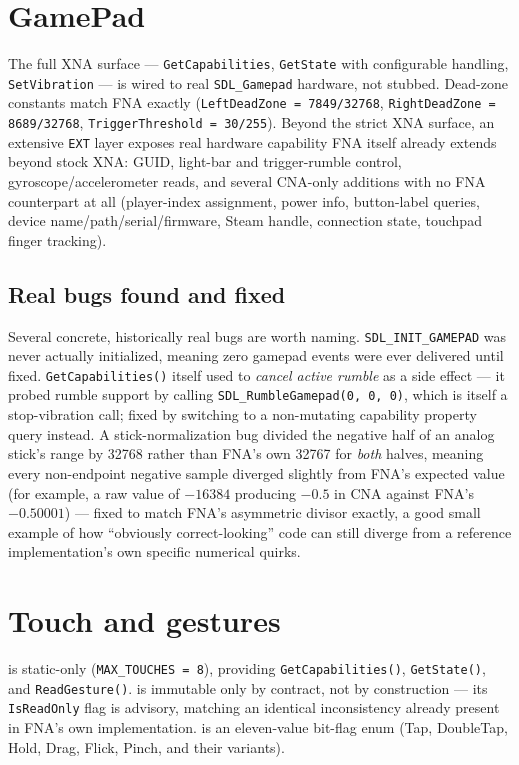\section{GamePad}

The full XNA surface --- \texttt{GetCapabilities}, \texttt{GetState} with configurable
 handling, \texttt{SetVibration} --- is wired to real
\texttt{SDL\_Gamepad} hardware, not stubbed. Dead-zone constants match FNA exactly
(\texttt{LeftDeadZone = 7849/32768}, \texttt{RightDeadZone = 8689/32768},
\texttt{TriggerThreshold = 30/255}). Beyond the strict XNA surface, an extensive
\texttt{EXT} layer exposes real hardware capability FNA itself already extends beyond stock
XNA: GUID, light-bar and trigger-rumble control, gyroscope/accelerometer reads, and several
CNA-only additions with no FNA counterpart at all (player-index assignment, power info,
button-label queries, device name/path/serial/firmware, Steam handle, connection state,
touchpad finger tracking).

\subsection{Real bugs found and fixed}

Several concrete, historically real bugs are worth naming. \texttt{SDL\_INIT\_GAMEPAD} was
never actually initialized, meaning zero gamepad events were ever delivered until fixed.
\texttt{GetCapabilities()} itself used to \emph{cancel active rumble} as a side effect ---
it probed rumble support by calling \texttt{SDL\_RumbleGamepad(0, 0, 0)}, which is itself a
stop-vibration call; fixed by switching to a non-mutating capability property query instead.
A stick-normalization bug divided the negative half of an analog stick's range by 32768
rather than FNA's own 32767 for \emph{both} halves, meaning every non-endpoint negative
sample diverged slightly from FNA's expected value (for example, a raw value of $-16384$
producing $-0.5$ in CNA against FNA's $-0.50001$) --- fixed to match FNA's asymmetric divisor
exactly, a good small example of how ``obviously correct-looking'' code can still diverge
from a reference implementation's own specific numerical quirks.

\section{Touch and gestures}

 is static-only (\texttt{MAX\_TOUCHES = 8}), providing
\texttt{GetCapabilities()}, \texttt{GetState()}, and \texttt{ReadGesture()}.
 is immutable only by contract, not by construction --- its
\texttt{IsReadOnly} flag is advisory, matching an identical inconsistency already present in
FNA's own implementation.  is an eleven-value bit-flag enum (Tap,
DoubleTap, Hold, Drag, Flick, Pinch, and their variants).

